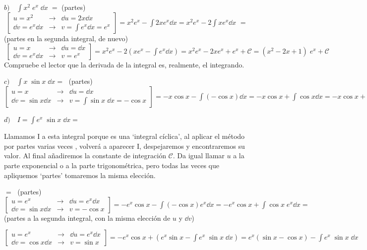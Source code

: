 \begin{ejem}
	$b) \quad \displaystyle \int x^2\; e^x\; \dd x \; =$ (partes) $\; \left[ \begin{matrix} u=x^2 & \to  & \dd u = 2x \dd x \\ \dd v = e^x \dd x & \to & v=\int e^x \dd x = e^x \end{matrix} \right]= x^2 e^x- \int 2x e^x \dd x=x^2 e^x- 2\int x e^x \dd x\; $ =(partes en la segunda integral, de nuevo) $\;\displaystyle  \left[ \begin{matrix} u=x & \to & \dd u = \dd  x \\ \dd v=e^x \dd x  & \to & v=e^x \end{matrix} \right] = x^2 e^x- 2 \left(x e^x - \int e^x \dd x \right)= x^2 e^x - 2 x e^x + e^x + \mathcal C= (x^2-2x+1)\; e^x +  \mathcal C\; $ \textcolor{gris}{Compruebe el lector que la derivada de la integral es, realmente, el integrando.}

	$c) \quad \displaystyle \int x\; \sin x\; \dd x = \; $ (partes)
	$ \displaystyle \left[ \begin{matrix} u=x & \to & \dd u=\dd x \\ \dd v= \sin x \dd x & \to & v=\int \sin x \; \dd x = -\cos x \end{matrix} \right]= -x\cos x - \int (-\cos x) \dd x = -x\cos x +\int \cos x \dd x= -x \cos x + \sin x +\mathcal C$
	
	$d) \quad \displaystyle I=\int e^x\; \sin x\; \dd x= \; $
	
	Llamamos I a esta integral porque es una `integral cíclica', al aplicar el método por partes varias veces , volverá a aparecer I, despejaremos y encontraremos su valor. Al final añadiremos la constante de integración $\mathcal C$. Da igual llamar $u$ a la parte exponencial o a la parte trigonométrica, pero todas las veces que apliquemos `partes' tomaremos la misma elección.
	
	$=\; $ (partes) $ \displaystyle \left[ \begin{matrix} u=e^x & \to & \dd u = e^x \dd x  \\ \dd v = \sin x \dd x & \to & v=-\cos x \end{matrix} \right] = -e^x \cos x - \int (-\cos x) e^x \dd x=  -e^x \cos x + \int \cos x \; e^x \dd x= \;$ (partes a la segunda integral, con la misma elección de $u$ y $\dd v$) 
	
	$ \left[ \begin{matrix} u=e^x  & \to & \dd u = e^x \dd x \\ \dd v= \cos x \dd x & \to & v=\sin x \end{matrix} \right] = \displaystyle  -e^x \cos x + \left( e^x \sin x -\int e^x \; \sin x \; \dd x \right) = e^x (\sin x - \cos x) - \int e^x \; \sin x \; \dd x$
	

\end{ejem}

